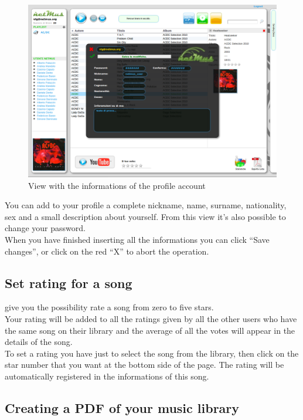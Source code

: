 \begin{figure}[htbp]
  \centering
  \includegraphics[width=15cm]{img/MU/profile_view.png}
\caption{View with the informations of the profile account}
\end{figure}

You can add to your profile a complete nickname, name, surname, nationality, sex
and a small description about yourself. From this view it's also possible to change
your password.\\
When you have finished inserting all the informations you can click ``Save
changes'', or click on the red ``X'' to abort the operation.

\subsection*{Set rating for a song}

 give you the possibility rate a song from zero to five
stars.\\
Your rating will be added to all the ratings given by all the other users who
have the same song on their library and the average of all the votes will appear
in the details of the song.\\
To set a rating you have just to select the song from the library, then click on
the star number that you want at the bottom side of the page. The rating will be
automatically registered in the informations of this song.

\subsection*{Creating a PDF of your music library}

